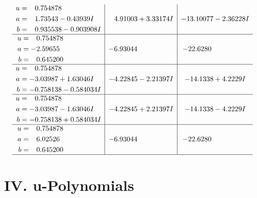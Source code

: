 \documentclass[1p]{elsarticle_modified}
\theoremstyle{definition}
\begin{document}
$$\begin{array}{c|c|c}
\begin{aligned}
u &= \phantom{-}0.754878\phantom{ +0.000000I} \\
a &= \phantom{-}1.73543 - 0.43939 I \\
b &= \phantom{-}0.935538 - 0.903908 I\end{aligned}
 & \phantom{-}4.91003 + 3.33174 I & -13.10077 - 2.36228 I \\ \hline\begin{aligned}
u &= \phantom{-}0.754878\phantom{ +0.000000I} \\
a &= -2.59655\phantom{ +0.000000I} \\
b &= \phantom{-}0.645200\phantom{ +0.000000I}\end{aligned}
 & -6.93044\phantom{ +0.000000I} & -22.6280\phantom{ +0.000000I} \\ \hline\begin{aligned}
u &= \phantom{-}0.754878\phantom{ +0.000000I} \\
a &= -3.03987 + 1.63046 I \\
b &= -0.758138 - 0.584034 I\end{aligned}
 & -4.22845 - 2.21397 I & -14.1338 + 4.2229 I \\ \hline\begin{aligned}
u &= \phantom{-}0.754878\phantom{ +0.000000I} \\
a &= -3.03987 - 1.63046 I \\
b &= -0.758138 + 0.584034 I\end{aligned}
 & -4.22845 + 2.21397 I & -14.1338 - 4.2229 I \\ \hline\begin{aligned}
u &= \phantom{-}0.754878\phantom{ +0.000000I} \\
a &= \phantom{-}6.02526\phantom{ +0.000000I} \\
b &= \phantom{-}0.645200\phantom{ +0.000000I}\end{aligned}
 & -6.93044\phantom{ +0.000000I} & -22.6280\phantom{ +0.000000I}\\
 \hline 
 \end{array}$$\newpage
\newpage\renewcommand{\arraystretch}{1}
\centering \section*{ IV. u-Polynomials}
\end{document}
